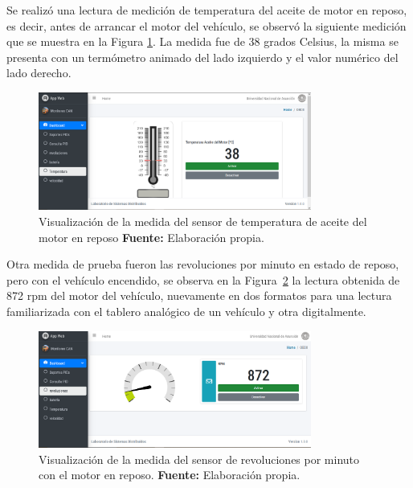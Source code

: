  Se realizó una lectura de medición de temperatura del aceite de motor en reposo, es decir, antes de arrancar el motor del vehículo, se observó la siguiente medición que se muestra en la Figura \ref{temp_ref_c6}. 
 La medida fue de 38 grados Celsius, la misma se presenta con un termómetro animado del lado izquierdo y el valor numérico del lado derecho.
 
 \begin{figure}[H]
	\centering
	\includegraphics[width=0.8\textwidth]{./Cap6imagen/temp_fig_c6.png}
	\caption [Visualización de la medida del sensor de temperatura de aceite del motor en reposo.]{Visualización de la medida del sensor de temperatura de aceite del motor en reposo \textbf{ Fuente:} %
		Elaboración propia.}
	\label{temp_ref_c6} %
\end{figure}

Otra medida de prueba fueron las revoluciones por minuto en estado de reposo, pero con el vehículo encendido, se observa en la Figura~\ref{rpm_ref_c6} la lectura obtenida de 872 rpm del motor del vehículo, nuevamente en dos formatos para una lectura familiarizada con el tablero analógico de un vehículo y otra digitalmente. 

\begin{figure}[H]
	\centering
	\includegraphics[width=0.8\textwidth]{./Cap6imagen/rpm_fig_c6.png}
	\caption [Visualización de la medida del sensor de revoluciones por minuto con el motor en reposo.]{Visualización de la medida del sensor de revoluciones por minuto con el motor en reposo.  \textbf{ Fuente:} %
		Elaboración propia.}
	\label{rpm_ref_c6} %
\end{figure}


